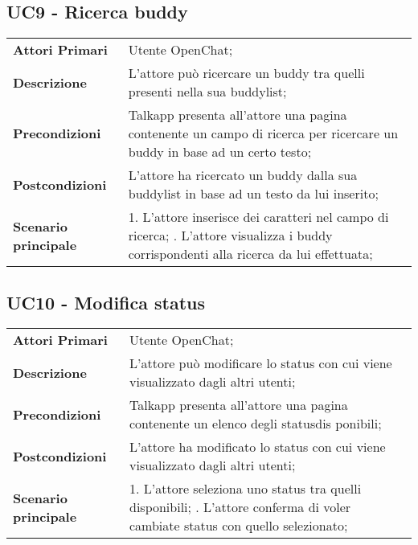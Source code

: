 \subsection{UC9 - Ricerca buddy}
\begin{center}
	\bgroup
	\def\arraystretch{1.8}     
	\begin{longtable}{  p{4cm} | p{9.5cm} } 
		\textbf{Attori Primari} & Utente OpenChat; \\ 
		\textbf{Descrizione} &  L'attore può ricercare un  buddy tra quelli presenti nella sua buddylist; \\ 
		\textbf{Precondizioni}  & Talkapp presenta all'attore una pagina contenente un campo di ricerca per ricercare un buddy in base ad un certo testo; \\
		\textbf{Postcondizioni} & L'attore ha ricercato un buddy dalla sua buddylist in base ad un testo da lui inserito;  \\ 
		\textbf{Scenario principale} & 
		1. L'attore inserisce dei caratteri nel campo di ricerca; \newline
		2. L'attore visualizza i buddy corrispondenti alla ricerca da lui effettuata;
	\end{longtable}
	\egroup
\end{center}

\subsection{UC10 - Modifica status}
\begin{center}
	\bgroup
	\def\arraystretch{1.8}     
	\begin{longtable}{  p{4cm} | p{9.5cm} } 
		\textbf{Attori Primari} & Utente OpenChat; \\ 
		\textbf{Descrizione} &  L'attore può modificare lo status con cui viene visualizzato dagli altri utenti; \\ 
		\textbf{Precondizioni}  & Talkapp presenta all'attore una pagina contenente un elenco degli statusdis ponibili; \\
		\textbf{Postcondizioni} & L'attore ha modificato lo status con cui viene visualizzato dagli altri utenti; \\ 
		\textbf{Scenario principale} & 
		1. L'attore seleziona uno status tra quelli disponibili; \newline
		2. L'attore conferma di voler cambiate status con quello selezionato;
	\end{longtable}
	\egroup
\end{center}

